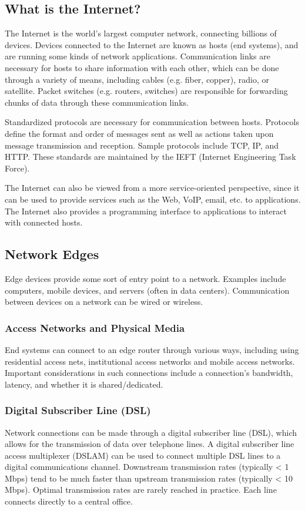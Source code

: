 \documentclass[12pt,titlepage]{article}
\begin{document}
    \subsection{What is the Internet?}
      The Internet is the world's largest computer network, connecting billions of devices. Devices
      connected to the Internet are known as hosts (end systems), and are running some kinds of network applications.
      Communication links are necessary for hosts to share information with each other, which can be done through
      a variety of means, including cables (e.g. fiber, copper), radio, or satellite. Packet switches (e.g. routers,
      switches) are responsible for forwarding chunks of data through these communication links.

      Standardized protocols are necessary for communication between hosts. Protocols define the format and order of
      messages sent as well as actions taken upon message transmission and reception. Sample protocols include TCP, IP, and HTTP.
      These standards are maintained by the IEFT (Internet Engineering Task Force).

      The Internet can also be viewed from a more service-oriented perspective, since it can be used to provide
      services such as the Web, VoIP, email, etc. to applications. The Internet also provides a programming interface
      to applications to interact with connected hosts.

    \subsection{Network Edges}
      Edge devices provide some sort of entry point to a network. Examples include computers, mobile devices, and servers
      (often in data centers). Communication between devices on a network can be wired or wireless.

      \subsubsection{Access Networks and Physical Media}
        End systems can connect to an edge router through various ways, including using residential access nets, institutional
        access networks and mobile access networks. Important considerations in such connections include a connection's bandwidth,
        latency, and whether it is shared/dedicated.

      \subsubsection{Digital Subscriber Line (DSL)}
        Network connections can be made through a digital subscriber line (DSL), which allows for the transmission of data over
        telephone lines. A digital subscriber line access multiplexer (DSLAM) can be used to connect multiple DSL lines to a digital
        communications channel. Downstream transmission rates (typically < 1 Mbps) tend to be much faster than upstream transmission
        rates (typically < 10 Mbps). Optimal transmission rates are rarely reached in practice. Each line connects directly to a
        central office.
\end{document}
